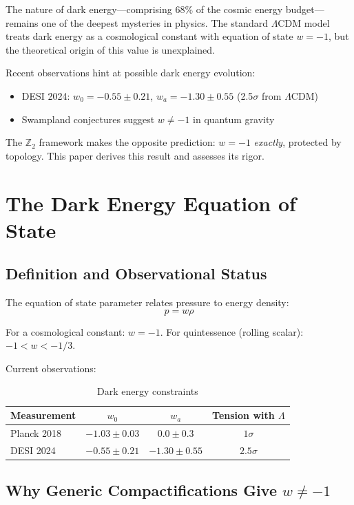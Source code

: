 \documentclass[12pt,a4paper]{article}
\begin{document}
The nature of dark energy---comprising 68\% of the cosmic energy budget---remains one of the deepest mysteries in physics. The standard $\Lambda$CDM model treats dark energy as a cosmological constant with equation of state $w = -1$, but the theoretical origin of this value is unexplained.

Recent observations hint at possible dark energy evolution:
\begin{itemize}
    \item DESI 2024: $w_0 = -0.55 \pm 0.21$, $w_a = -1.30 \pm 0.55$ (2.5$\sigma$ from $\Lambda$CDM)
    \item Swampland conjectures suggest $w \neq -1$ in quantum gravity
\end{itemize}

The $\mathbb{Z}_2$ framework makes the opposite prediction: $w = -1$ \textit{exactly}, protected by topology. This paper derives this result and assesses its rigor.

\section{The Dark Energy Equation of State}

\subsection{Definition and Observational Status}

The equation of state parameter relates pressure to energy density:
\begin{equation}
p = w \rho
\end{equation}

For a cosmological constant: $w = -1$. For quintessence (rolling scalar): $-1 < w < -1/3$.

Current observations:
\begin{table}[h]
\centering
\begin{tabular}{lccc}
\toprule
Measurement & $w_0$ & $w_a$ & Tension with $\Lambda$ \\
\midrule
Planck 2018 & $-1.03 \pm 0.03$ & $0.0 \pm 0.3$ & $1\sigma$ \\
DESI 2024 & $-0.55 \pm 0.21$ & $-1.30 \pm 0.55$ & $2.5\sigma$ \\
\bottomrule
\end{tabular}
\caption{Dark energy constraints}
\end{table}

\subsection{Why Generic Compactifications Give $w \neq -1$}
\end{document}
